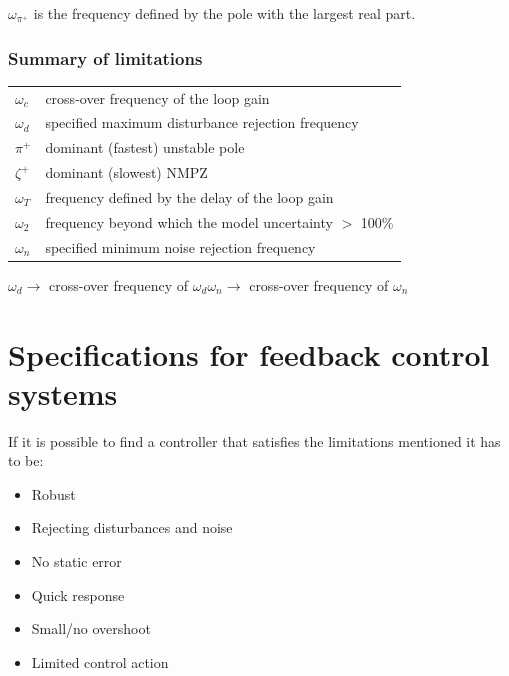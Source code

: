 \documentclass[10pt,a4paper]{scrartcl}
\begin{document}
\begin{multicols*}{3}
	
	$\omega_{\pi^+}$ is the frequency defined by the pole with the largest real part.
	
	
	
	\subsubsection{Summary of limitations}
	
	\footnotesize
	\begin{tabular}{l@{ = }l}
	$\omega_c$&cross-over frequency of the loop gain\\
	$\omega_d$&specified maximum disturbance rejection frequency\\
	$\pi^+$&dominant (\glqq fastest\grqq) unstable pole\\
	$\zeta^+$&dominant (\glqq slowest\grqq) NMPZ\\
	$\omega_T$&frequency defined by the delay of the loop gain\\
	$\omega_2$&frequency beyond which the model uncertainty $>$ 100\%\\
	$\omega_n$&specified minimum noise rejection frequency
	\end{tabular}
	
	\tiny{$\omega_d\rightarrow$ cross-over frequency of $\omega_d$\hfill$\omega_n\rightarrow$ cross-over frequency of $\omega_n$}
	
	\large
	\normalsize
	
	
	
	
	\section{Specifications for feedback control systems}
	
	If it is possible to find a controller that satisfies the limitations mentioned it has to be:
	
	\small
	\begin{itemize}
	\compaq
	\item
	Robust
	\item
	Rejecting disturbances and noise
	\item
	No static error
	\item
	Quick response
	\item
	Small/no overshoot
	\item
	Limited control action
	\end{itemize}
	\normalsize
	

\end{multicols*}
\end{document}
